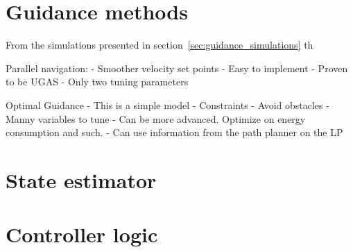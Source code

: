 \section{Guidance methods} %
\label{sec:dis_guidance_methods}
From the simulations presented in section~\ref{sec:guidance_simulations} th


Parallel navigation:
- Smoother velocity set points
- Easy to implement
- Proven to be UGAS
- Only two tuning parameters


Optimal Guidance 
- This is a simple model
- Constraints 
- Avoid obstacles
- Manny variables to tune
- Can be more advanced. Optimize on energy consumption and such.
- Can use information from the path planner on the LP



\section{State estimator} %
\label{sec:dis_state_estimator}



\section{Controller logic} %
\label{sec:dis_controller_logic}


